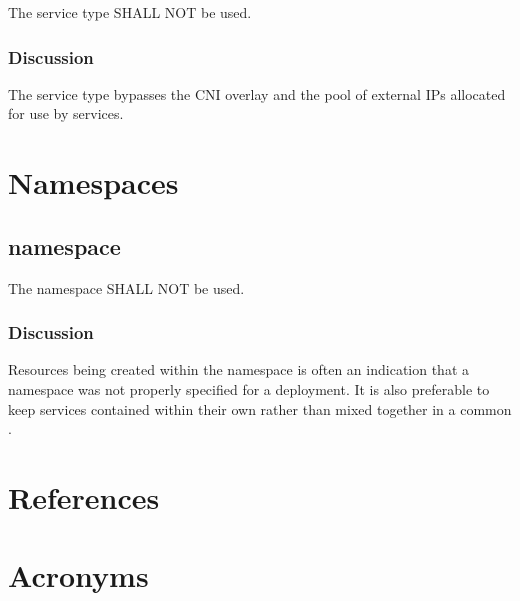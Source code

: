 \documentclass[PMO,authoryear,toc]{lsstdoc}
\begin{document}
The  service type SHALL NOT be used.

\subsubsection{Discussion}

The  service type bypasses the CNI overlay and the pool of external IPs allocated for use by  services.

\section{Namespaces}\label{sec:ns}

\subsection{ namespace}

The  namespace SHALL NOT be used.

\subsubsection{Discussion}

Resources being created within the  namespace is often an indication that a namespace was not properly specified for a deployment. It is also preferable to keep services contained within their own  rather than mixed together in a common .

\appendix
\section{References} \label{sec:bib}
\renewcommand{\refname}{} %


\section{Acronyms} \label{sec:acronyms}

\end{document}

